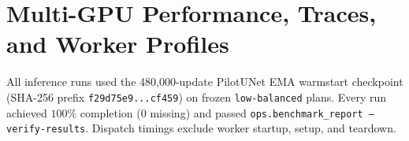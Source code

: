 \documentclass[11pt,a4paper]{article}
\begin{document}
\section{Multi-GPU Performance, Traces, and Worker Profiles}
All inference runs used the 480,000-update PilotUNet EMA warmstart checkpoint (SHA-256 prefix \texttt{f29d75e9...cf459}) on frozen \texttt{low-balanced} plans. Every run achieved $100\%$ completion ($0$ missing) and passed \texttt{ops.benchmark\_report --verify-results}. Dispatch timings exclude worker startup, setup, and teardown.

\begin{table}[ht]
\centering
\small
{}
\caption{Verified makespan, descriptive ratio vs.\ \texttt{gpu-3} alone, throughput, request duration quantiles, and worker splits (sanitized summary in \texttt{network-report/benchmark-summary.json}).}
\label{tab:perf}
\end{table}
\end{document}
